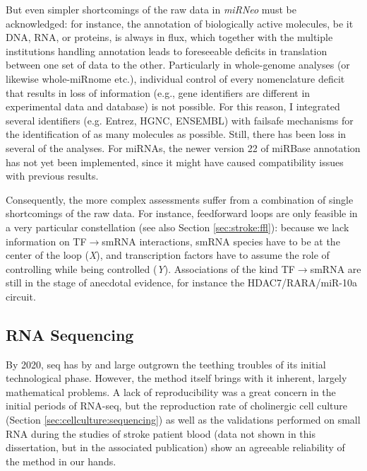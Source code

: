 But even simpler shortcomings of the raw data in \emph{miRNeo} must be acknowledged: for instance, the annotation of biologically active molecules, be it DNA, RNA, or proteins, is always in flux, which together with the multiple institutions handling annotation leads to foreseeable deficits in translation between one set of data to the other. Particularly in whole-genome analyses (or likewise whole-miRnome etc.), individual control of every nomenclature deficit that results in loss of information (e.g., gene identifiers are different in experimental data and database) is not possible. For this reason, I integrated several identifiers (e.g. Entrez, HGNC, ENSEMBL) with failsafe mechanisms for the identification of as many molecules as possible. Still, there has been loss in several of the analyses. For miRNAs, the newer version 22 of miRBase annotation has not yet been implemented, since it might have caused compatibility issues with previous results.

Consequently, the more complex assessments suffer from a combination of single shortcomings of the raw data. For instance, feedforward loops are only feasible in a very particular constellation (see also Section \ref{sec:stroke:ffl}): because we lack information on TF$\to$smRNA interactions, smRNA species have to be at the center of the loop (\emph{X}), and transcription factors have to assume the role of controlling while being controlled (\emph{Y}). Associations of the kind TF$\to$smRNA are still in the stage of anecdotal evidence, for instance the HDAC7/RARA/miR-10a circuit.\cite{Lee2017}

\subsection{RNA Sequencing} \label{sec:discussion:rna-seq}
By 2020, \ac{seq} has by and large outgrown the teething troubles of its initial technological phase. However, the method itself brings with it inherent, largely mathematical problems. A lack of reproducibility was a great concern in the initial periods of RNA-seq, but the reproduction rate of cholinergic cell culture (Section \ref{sec:cellculture:sequencing}) as well as the validations performed on small RNA during the studies of stroke patient blood (data not shown in this dissertation, but in the associated publication\cite{Winek2020}) show an agreeable reliability of the method in our hands.

